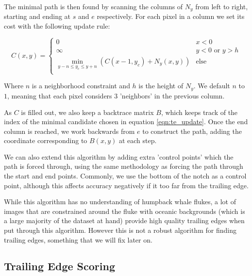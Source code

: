 The minimal path is then found by scanning the columns of $N_y$ from left to right, starting and ending at $s$ and $e$ respectively. 
For each pixel in a column we set its cost with the following update rule:

\begin{equation} \label{eqn:te_update}
C(x,y) = 
\begin{cases}
	0 & x < 0 \\
	\infty & y < 0 \text{ or } y > h \\
	\min_{y - n \leq y_c \leq y + n}(C(x-1, y_c) + N_y(x,y)) & \text{else} \\
\end{cases}
\end{equation}

Where $n$ is a neighborhood constraint and $h$ is the height of $N_y$.  
We default $n$ to $1$, meaning that each pixel considers $3$ 'neighbors' in the previous column.

As $C$ is filled out, we also keep a backtrace matrix $B$, which keeps track of the index of the minimal candidate chosen in equation \ref{eqn:te_update}.
Once the end column is reached, we work backwards from $e$ to construct the path, adding the coordinate corresponding to $B(x,y)$ at each step.


We can also extend this algorithm by adding extra 'control points' which the path is forced through, using the same methodology as forcing the path through the start and end points.
Commonly, we use the bottom of the notch as a control point, although this affects accuracy negatively if it too far from the trailing edge.

While this algorithm has no understanding of humpback whale flukes, a lot of images that are constrained around the fluke with oceanic backgrounds (which is a large majority of the dataset at hand) provide high quality trailing edges when put through this algorithm.
However this is not a robust algorithm for finding trailing edges, something that we will fix later on.


\subsection{Trailing Edge Scoring}

